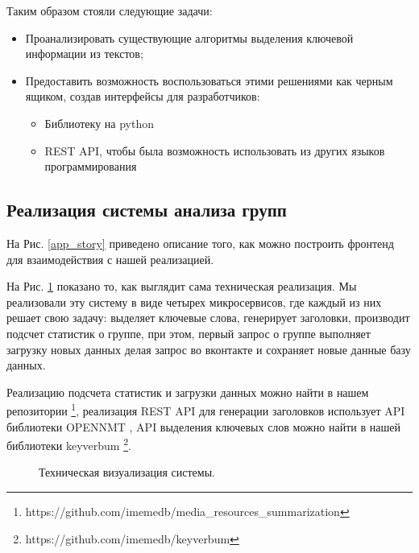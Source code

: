 \documentclass[14pt]{matmex-diploma-custom}
\begin{document}
Таким образом стояли следующие задачи:

\begin{itemize}
  \item Проанализировать существующие алгоритмы выделения ключевой информации из текстов;
  \item Предоставить возможность воспользоваться этими решениями как черным ящиком, создав интерфейсы для разработчиков:
  \begin{itemize}
    \item Библиотеку на python
    \item REST API, чтобы была возможность использовать из других языков программирования
  \end{itemize}
\end{itemize}

\subsection{Реализация системы анализа групп}

На Рис. \ref{app_story} приведено описание того, как можно построить фронтенд для взаимодействия с нашей реализацией.

На Рис. \ref{img:techincal_story} показано то, как выглядит сама техническая реализация. Мы реализовали эту систему в виде четырех микросервисов, где каждый из них решает свою задачу: выделяет ключевые слова, генерирует заголовки, производит подсчет статистик о группе, при этом, первый запрос о группе выполняет загрузку новых данных делая запрос во вконтакте и сохраняет новые данные базу данных.

Реализацию подсчета статистик и загрузки данных можно найти в нашем репозитории \footnote{https://github.com/imemedb/media\_resources\_summarization}, реализация REST API для генерации заголовков использует API библиотеки OPENNMT \cite{2017opennmt}, API выделения ключевых слов можно найти в нашей библиотеки keyverbum \footnote{https://github.com/imemedb/keyverbum}.

\begin{figure}[ht]
\begin{center}


\caption{
\label{img:techincal_story} Техническая визуализация системы.
        }
\end {center}
\end {figure}
\end{document}
